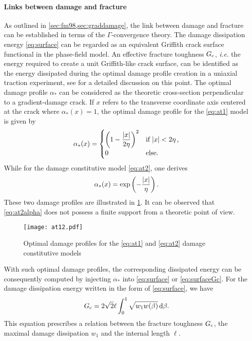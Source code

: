 \paragraph{Links between damage and fracture} As outlined in \cref{sec:fm98,sec:graddamage}, the link between damage and fracture can be established in terms of the $\Gamma$-convergence theory. The damage dissipation energy \eqref{eq:surface} can be regarded as an equivalent Griffith crack surface functional in the phase-field model. An effective fracture toughness $G_\mathrm{c}$, \emph{i.e.} the energy required to create a unit Griffith-like crack surface, can be identified as the energy dissipated during the optimal damage profile creation in a uniaxial traction experiment, see \cite{PhamAmorMarigoMaurini:2011} for a detailed discussion on this point. The optimal damage profile $\alpha_*$ can be considered as the theoretic cross-section perpendicular to a gradient-damage crack. If $x$ refers to the transverse coordinate axis centered at the crack where $\alpha_*(x)=1$, the optimal damage profile for the \eqref{eq:at1} model is given by
\begin{equation} \label{eq:at1alpha}
\alpha_*(x)=\begin{cases}
\left(1-\dfrac{\left\lvert{x}\right\rvert}{2\eta}\right)^2 & \text{if $\left\lvert{x}\right\rvert<2\eta$\,,} \\
0 & \text{else}.
\end{cases}
\end{equation}
While for the damage constitutive model \eqref{eq:at2}, one derives
\begin{equation} \label{eq:at2alpha}
\alpha_*(x)=\exp\left(-\frac{\left\lvert{x}\right\rvert}{\eta}\right).
\end{equation}
These two damage profiles are illustrated in \cref{fig:at12}. It can be observed that \eqref{eq:at2alpha} does not possess a finite support from a theoretic point of view.
\begin{figure}[htbp]
\centering
\texttt{[image: at12.pdf]}
\caption{Optimal damage profiles for the \eqref{eq:at1} and \eqref{eq:at2} damage constitutive models} \label{fig:at12}
\end{figure}
With such optimal damage profiles, the corresponding dissipated energy can be consequently computed by injecting $\alpha_*$ into \eqref{eq:surface} or \eqref{eq:surfaceGc}. For the damage dissipation energy written in the form of \eqref{eq:surface}, we have
\begin{equation} \label{eq:gcingd}
G_\mathrm{c}=2\sqrt{2}\ell\int_0^1\sqrt{w_1w(\beta)}\,\mathrm{d}\beta.
\end{equation}
This equation prescribes a relation between the fracture toughness $G_\mathrm{c}$, the maximal damage dissipation $w_1$ and the internal length $\ell$.

